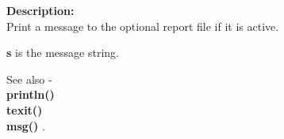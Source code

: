         {\bf Description:} \\
        Print a message to the optional report file if it is active.
        
        {\bf s} is the message string.
                
        See also - \\
        {\bf println()}  \\
        {\bf texit()}  \\
        {\bf msg()} .


%       
%        
%        
%        
%        
